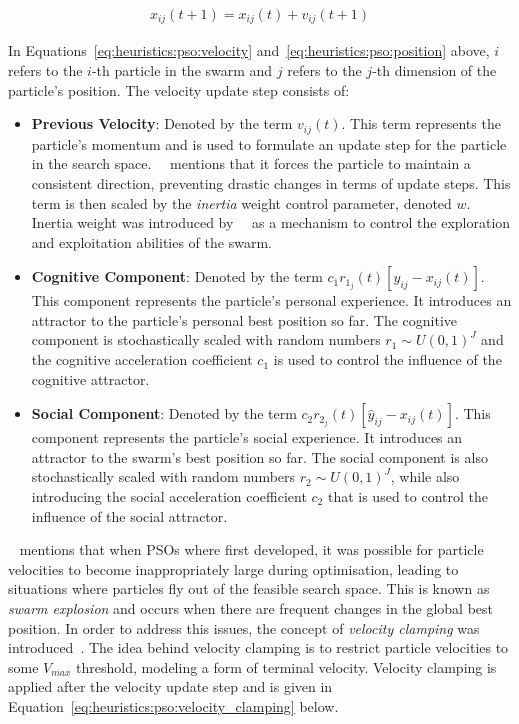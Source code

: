 \begin{equation}
      \label{eq:heuristics:pso:position}
      \begin{split}
            x_{ij}(t+1) = x_{ij}(t) + v_{ij}(t+1)
      \end{split}
\end{equation}

\noindent
In Equations~\eqref{eq:heuristics:pso:velocity} and~\eqref{eq:heuristics:pso:position} above, $i$ refers to the $i$-th particle in the swarm and $j$ refers to the $j$-th dimension of  the particle's position. The velocity update step consists of:

\begin{itemize}
      \item \textbf{Previous Velocity}: Denoted by the term $v_{ij}(t)$. This term represents the particle's momentum and is used to formulate an update step for the particle in the search space.~\citeauthor{ref:vanwyk:2014}~\cite{ref:vanwyk:2014} mentions that it forces the particle to maintain a consistent direction, preventing drastic changes in terms of update steps. This term is then scaled by the \textit{inertia} weight control parameter, denoted $w$. Inertia weight was introduced by~\citeauthor{ref:shi:1998}~\cite{ref:shi:1998} as a mechanism to control the exploration and exploitation abilities of the swarm.

      \item \textbf{Cognitive Component}: Denoted by the term $c_{1}r_{1_{j}}(t)[y_{ij} - x_{ij}(t)]$. This component represents the particle's personal  experience. It introduces an attractor to the particle's personal best position so far. The cognitive component is stochastically scaled with random numbers $r_{1} \sim U(0,1)^J$ and the cognitive acceleration coefficient $c_{1}$ is used to control the influence of the cognitive attractor.

      \item \textbf{Social Component}: Denoted by the term $c_{2}r_{2_{j}}(t)[\hat{y}_{ij} - x_{ij}(t)]$. This component represents the particle's social  experience. It introduces an attractor to the swarm's best position so far. The social component is also stochastically scaled with random numbers $r_{2} \sim U(0,1)^J$, while also introducing the social acceleration coefficient $c_{2}$ that is used to control the influence of the social attractor.
\end{itemize}

\noindent
~\citeauthor{ref:vanwyk:2014}\cite{ref:vanwyk:2014} mentions that when \acp{PSO} where first developed, it was possible for particle velocities to become inappropriately large during optimisation, leading to situations where particles fly out of the feasible search space. This is known as \textit{swarm explosion} and occurs when there are frequent changes in the global best position. In order to address this issues, the concept of \textit{velocity clamping} was introduced~\cite{ref:eberhart:1996}. The idea behind velocity clamping is to restrict particle velocities to some $V_{max}$ threshold, modeling a form of terminal velocity. Velocity clamping is applied after the velocity update step and is given in Equation~\eqref{eq:heuristics:pso:velocity_clamping} below.

